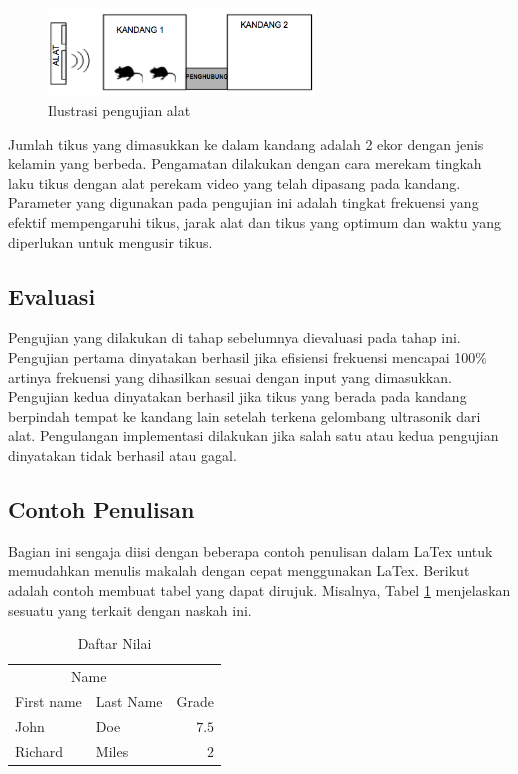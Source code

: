 \begin{figure}[h!]\centering %
\includegraphics[width=200pt]{kolokium_contoh_gb4.png}
\caption{Ilustrasi pengujian alat}
\label{fig:pengujian}
\end{figure}

Jumlah tikus yang dimasukkan ke dalam kandang adalah 2 ekor dengan jenis kelamin yang berbeda. Pengamatan dilakukan dengan cara merekam tingkah laku tikus dengan alat perekam video yang telah dipasang pada kandang. Parameter yang digunakan pada pengujian ini adalah tingkat frekuensi yang efektif mempengaruhi tikus, jarak alat dan tikus yang optimum dan waktu yang diperlukan untuk mengusir tikus.

\subsection*{Evaluasi}
Pengujian yang dilakukan di tahap sebelumnya dievaluasi pada tahap ini. Pengujian pertama dinyatakan berhasil jika efisiensi frekuensi mencapai 100$\%$ artinya frekuensi yang dihasilkan sesuai dengan input yang dimasukkan. Pengujian kedua dinyatakan berhasil jika tikus yang berada pada kandang berpindah tempat ke kandang lain setelah terkena gelombang ultrasonik dari alat. Pengulangan implementasi dilakukan jika salah satu atau kedua pengujian dinyatakan tidak berhasil atau gagal.

\subsection*{Contoh Penulisan}

Bagian ini sengaja diisi dengan beberapa contoh penulisan dalam LaTex untuk memudahkan menulis makalah dengan cepat menggunakan LaTex. Berikut adalah contoh membuat tabel yang dapat dirujuk. Misalnya, Tabel \ref{tab:daftarsaya} menjelaskan sesuatu yang terkait dengan naskah ini.

\begin{table}[hbt]
\caption{Daftar Nilai}
\centering
\begin{tabular}{llr}
\toprule
\multicolumn{2}{c}{Name} \\
\cmidrule(r){1-2}
First name & Last Name & Grade \\
\midrule
John & Doe & $7.5$ \\
Richard & Miles & $2$ \\
\bottomrule
\end{tabular}
\label{tab:daftarsaya}
\end{table}


